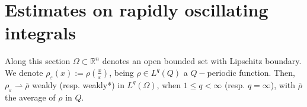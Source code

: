 \documentclass[12pt]{amsart}
\theoremstyle{definition}
\theoremstyle{remark}
\numberwithin{equation}{section}
\begin{document}
%
%
%
%
%
%
%
%
% 
 
 

 

\section{Estimates on rapidly oscillating integrals} \label{sec2}

\noindent Along this section $\Omega\subset \mathbb R^n$ denotes an open bounded set with Lipschitz boundary. We denote  $\rho_\varepsilon(x):=\rho(\tfrac{x}{\varepsilon})$, being $\rho\in L^q(Q)$  a $Q-$periodic function. Then, $\rho_\varepsilon \rightharpoonup \bar \rho$ weakly (resp. weakly*) in $L^q(\Omega)$, when $1\leq q<\infty$ (resp. $q=\infty$),  with $\bar \rho$ the average of $\rho$ in $Q$.
\end{document}
